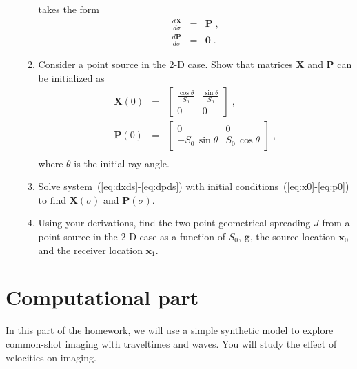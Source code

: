 \begin{enumerate}
\begin{enumerate}
    takes the form
  \begin{eqnarray}
    \label{eq:dxds}
    {\frac{d \mathbf{X}}{d \sigma}} & = & \mathbf{P}\;, \\
    {\frac{d \mathbf{P}}{d \sigma}} & = & \mathbf{0}\;.
    \label{eq:dpds}
  \end{eqnarray}
\item Consider a point source in the 2-D case. Show that matrices
  $\mathbf{X}$ and $\mathbf{P}$ can be initialized as
  \begin{eqnarray}
    \label{eq:x0}
    \mathbf{X}(0) & = & \left[\begin{array}{cc} 
        \frac{\cos \theta}{S_0} & \frac{\sin \theta}{S_0} \\
        0 & 0 \end{array}\right]\;, \\
    \mathbf{P}(0) & = & \left[\begin{array}{cc} 
        0 & 0 \\
        -S_0\,\sin \theta & S_0\,\cos \theta \end{array}\right]\;, \\
    \label{eq:p0}
  \end{eqnarray}
  where $\theta$ is the initial ray angle.
\item Solve system~(\ref{eq:dxds}-\ref{eq:dpds}) with initial
  conditions~(\ref{eq:x0}-\ref{eq:p0}) to find $\mathbf{X}(\sigma)$
  and $\mathbf{P}(\sigma)$.
\item Using your derivations, find the two-point geometrical spreading
  $J$ from a point source in the 2-D case as a function of $S_0$,
  $\mathbf{g}$, the source location $\mathbf{x}_0$ and the receiver
  location $\mathbf{x}_1$.
\end{enumerate}

\end{enumerate}

\section{Computational part}

In this part of the homework, we will use a simple synthetic model to
explore common-shot imaging with traveltimes and waves. You will study
the effect of velocities on imaging.

\lstset{language=python,numbers=left,numberstyle=\tiny,showstringspaces=false}

